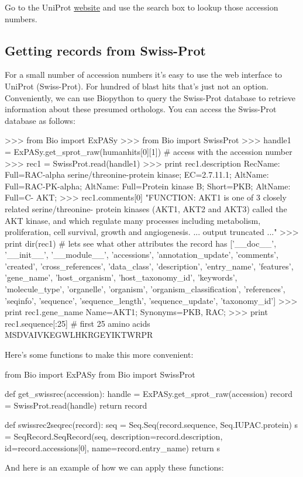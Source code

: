 Go to the UniProt \href{http://www.uniprot.org/}{website} and use the search box to lookup those accession numbers.



\subsection{Getting records from Swiss-Prot}

For a small number of accession numbers it's easy to use the web interface to UniProt (Swiss-Prot). For hundred of blast hits that's just not an option. Conveniently, we can use Biopython to query the Swiss-Prot database to retrieve information about these presumed orthologs. You can access the Swiss-Prot database as follows:

\begin{python}
>>> from Bio import ExPASy
>>> from Bio import SwissProt
>>> handle1 = ExPASy.get_sprot_raw(humanhits[0][1]) # access with the accession number
>>> rec1 = SwissProt.read(handle1)
>>> print rec1.description
RecName: Full=RAC-alpha serine/threonine-protein kinase; EC=2.7.11.1; AltName:
Full=RAC-PK-alpha; AltName: Full=Protein kinase B; Short=PKB; AltName: Full=C-
AKT;
>>> rec1.comments[0]
"FUNCTION: AKT1 is one of 3 closely related serine/threonine- protein kinases (AKT1, AKT2 and AKT3) called the AKT kinase, and which regulate many processes including metabolism, proliferation, cell survival, growth and angiogenesis.
... output truncated ..."
>>> print dir(rec1) # lets see what other attributes the record has
['__doc__', '__init__', '__module__', 'accessions', 'annotation_update', 'comments', 'created', 'cross_references', 'data_class', 'description', 'entry_name', 'features', 'gene_name', 'host_organism', 'host_taxonomy_id', 'keywords', 'molecule_type', 'organelle', 'organism', 'organism_classification', 'references', 'seqinfo', 'sequence', 'sequence_length', 'sequence_update', 'taxonomy_id']
>>> print rec1.gene_name
Name=AKT1; Synonyms=PKB, RAC;
>>> print rec1.sequence[:25] # first 25 amino acids
MSDVAIVKEGWLHKRGEYIKTWRPR
\end{python}

Here's some functions to make this more convenient:

\begin{python}
from Bio import ExPASy
from Bio import SwissProt

def get_swissrec(accession):
    handle = ExPASy.get_sprot_raw(accession)
    record = SwissProt.read(handle)
    return record

def swissrec2seqrec(record):
    seq = Seq.Seq(record.sequence, Seq.IUPAC.protein)
    s = SeqRecord.SeqRecord(seq, description=record.description,
                id=record.accessions[0], name=record.entry_name)
    return s
\end{python}
%
And here is an example of how we can apply these functions:

